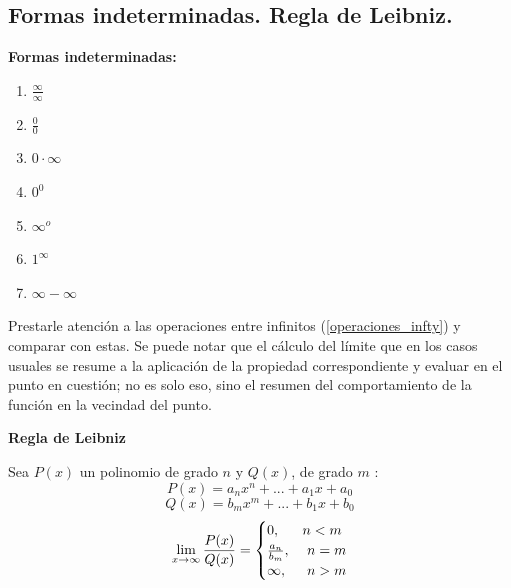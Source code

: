 \documentclass[10pt,twoside]{SelfArx} %
\begin{document}


\subsection{Formas indeterminadas. Regla de Leibniz.}

\textbf{Formas indeterminadas:}\\
 
\begin{enumerate}\label{formasIndeterminadas}
	\item $ \frac{\infty}{\infty} $
	\item $ \frac{0}{0} $
	\item $ 0\cdot \infty $
	\item $ 0^{0} $
	\item $ \infty^{o} $
	\item $ 1^{\infty} $
	\item $ \infty-\infty $
\end{enumerate}
Prestarle atención a las operaciones entre infinitos (\ref{operaciones_infty}) y comparar con estas. Se puede notar que el c\'alculo del límite que en los casos usuales se resume a la aplicación de la propiedad correspondiente y evaluar en el punto en cuestión; no es solo eso, sino el resumen del comportamiento de la función en la vecindad del punto.\\
\begin{center}
\textbf{Regla de Leibniz}\\	
\end{center}

\begin{thm}
	Sea $ P(x) $ un polinomio de grado $ n $ y $ Q(x) $, de grado $ m $ :\\
	\[ P(x)=a_{n} x^{n}+...+a_{1} x+a_{0} \]
	\[ Q(x)=b_{m} x^{m}+...+b_{1} x+b_{0} \]
	\[ \lim\limits_{x\rightarrow\infty} \frac{P(x)}{Q(x)}=
	\begin{cases}
	0, & \mbox{$ n<m $} \\
	\frac{a_{n}}{b_{m}}, & \mbox{ $ n=m $}\\
	\infty, & \mbox{ $ n>m $}
	\end{cases}
	\]
		
\end{thm}
\end{document}
